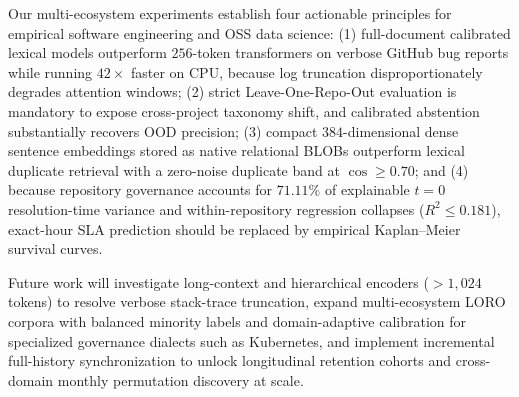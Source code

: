 \documentclass[conference]{IEEEtran}
\begin{document}
Our multi-ecosystem experiments establish four actionable principles for empirical software engineering and OSS data science: (1) full-document calibrated lexical models outperform $256$-token transformers on verbose GitHub bug reports while running $42\times$ faster on CPU, because log truncation disproportionately degrades attention windows; (2) strict Leave-One-Repo-Out evaluation is mandatory to expose cross-project taxonomy shift, and calibrated abstention substantially recovers OOD precision; (3) compact $384$-dimensional dense sentence embeddings stored as native relational BLOBs outperform lexical duplicate retrieval with a zero-noise duplicate band at $\cos \ge 0.70$; and (4) because repository governance accounts for $71.11\%$ of explainable $t=0$ resolution-time variance and within-repository regression collapses ($R^2 \le 0.181$), exact-hour SLA prediction should be replaced by empirical Kaplan--Meier survival curves.

Future work will investigate long-context and hierarchical encoders ($>1{,}024$ tokens) to resolve verbose stack-trace truncation, expand multi-ecosystem LORO corpora with balanced minority labels and domain-adaptive calibration for specialized governance dialects such as Kubernetes, and implement incremental full-history synchronization to unlock longitudinal retention cohorts and cross-domain monthly permutation discovery at scale.



\end{document}
